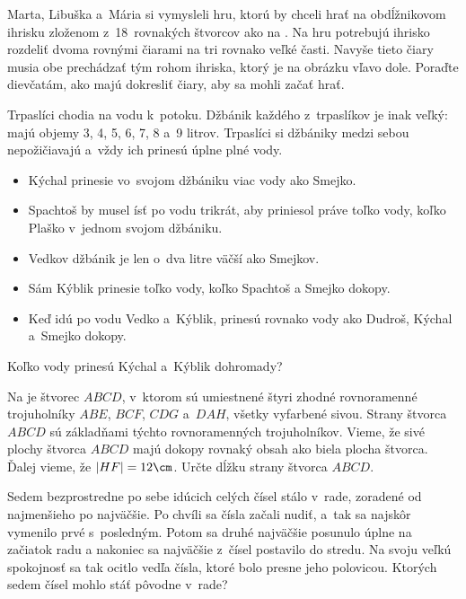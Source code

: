 {%
Marta, Libuška a~Mária si vymysleli hru, ktorú by chceli hrať na
obdĺžnikovom ihrisku zloženom z~18~rovnakých štvorcov ako na \obr.
Na hru potrebujú ihrisko rozdeliť dvoma rovnými čiarami na tri rovnako veľké časti.
Navyše tieto čiary musia obe prechádzať tým rohom ihriska, ktorý je na obrázku vľavo dole. Poraďte dievčatám, ako majú dokresliť čiary, aby sa mohli začať hrať.
%
}

{%
Trpaslíci chodia na vodu k~potoku. Džbánik každého z~trpaslíkov je inak veľký: majú objemy 3, 4, 5, 6, 7, 8 a~9 litrov. Trpaslíci si džbániky
medzi sebou nepožičiavajú a~vždy ich prinesú úplne plné vody.
\begin{itemize}
  \item Kýchal prinesie vo~svojom džbániku viac vody ako Smejko.
  \item Spachtoš by musel ísť po vodu trikrát, aby priniesol práve toľko vody, koľko Plaško v~jednom svojom džbániku.
  \item Vedkov džbánik je len o~dva litre väčší ako Smejkov.
  \item Sám Kýblik prinesie toľko vody, koľko Spachtoš a Smejko dokopy.
  \item Keď idú po vodu Vedko a~Kýblik, prinesú rovnako vody ako Dudroš, Kýchal a~Smejko dokopy.
\end{itemize}
    Koľko vody prinesú Kýchal a~Kýblik dohromady?
}

{%
Na \obr{} je štvorec $ABCD$, v~ktorom sú umiestnené štyri zhodné rovnoramenné trojuholníky $ABE$, $BCF$, $CDG$ a~$DAH$, všetky vyfarbené sivou. Strany štvorca $ABCD$ sú základňami týchto rovnoramenných trojuholníkov. Vieme, že sivé plochy štvorca $ABCD$ majú dokopy rovnaký obsah ako biela plocha štvorca. Ďalej vieme, že $|HF|= 12\cm$.
Určte dĺžku strany štvorca $ABCD$.
%
}

{%
Sedem bezprostredne po sebe idúcich celých čísel stálo v~rade, zoradené od najmenšieho po najväčšie. Po chvíli sa čísla začali nudiť, a~tak sa najskôr vymenilo prvé s~posledným. Potom sa druhé najväčšie posunulo úplne na začiatok radu a nakoniec sa najväčšie z~čísel postavilo do stredu. Na svoju veľkú spokojnosť sa tak ocitlo vedľa čísla, ktoré bolo presne jeho polovicou. Ktorých sedem čísel mohlo stáť pôvodne v~rade?
}

